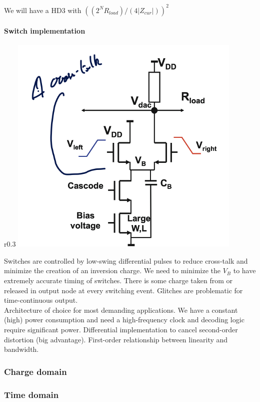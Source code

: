 \documentclass[
  a4paper,
]{article}
\begin{document}
We will have a HD3 with \(((2^N R_{load})/(4|Z_{cur}|))^2\)

\hypertarget{switch-implementation}{%
\paragraph{Switch implementation}\label{switch-implementation}}

r0.3 \includegraphics{img/switch_impl.png}

Switches are controlled by low-swing differential pulses to reduce
cross-talk and minimize the creation of an inversion charge. We need to
minimize the \(V_B\) to have extremely accurate timing of switches.
There is some charge taken from or released in output node at every
switching event. Glitches are problematic for time-continuous output.\\
Architecture of choice for most demanding applications. We have a
constant (high) power consumption and need a high-frequency clock and
decoding logic require significant power. Differential implementation to
cancel second-order distortion (big advantage). First-order relationship
between linearity and bandwidth.

\hypertarget{charge-domain}{%
\subsubsection{Charge domain}\label{charge-domain}}

\hypertarget{time-domain}{%
\subsubsection{Time domain}\label{time-domain}}
\end{document}
